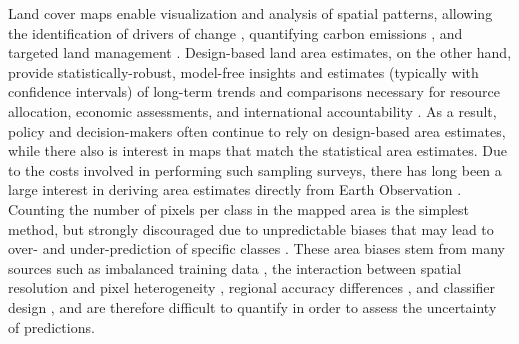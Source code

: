     Land cover maps enable visualization and analysis of spatial patterns, allowing the identification of drivers of change \citep{sy2019tropical}, quantifying carbon emissions \citep{avitabile2016carbon}, and targeted land management \citep{verburg2011challenges}. Design-based land area estimates, on the other hand, provide statistically-robust, model-free insights and estimates (typically with confidence intervals) of long-term trends and comparisons necessary for resource allocation, economic assessments, and international accountability \citep{olofsson2014good,gallego2017copernicus}. 
    As a result, policy and decision-makers often continue to rely on design-based area estimates, while there also is interest in maps that match the statistical area estimates. Due to the costs involved in performing such sampling surveys, there has long been a large interest in deriving area estimates directly from Earth Observation \citep{gallego2004remote}. Counting the number of pixels per class in the mapped area is the simplest method, but strongly discouraged due to unpredictable biases that may lead to over- and under-prediction of specific classes \citep{gallego2004remote,olofsson2014good,waldner2017where}. These area biases stem from many sources such as imbalanced training data \citep{he2009learning,mellor2015exploring,zhu2016optimizing}, the interaction between spatial resolution and pixel heterogeneity \citep{strahler2006global,herold2008challenges}, regional accuracy differences \citep{waldner2016towards,witjes2022spatiotemporal,duarte2023thematic}, and classifier design \citep{waldner2016towards,ghorbani2020comparing,demirkaya2020exploring}, and are therefore difficult to quantify in order to assess the uncertainty of predictions. 
    
